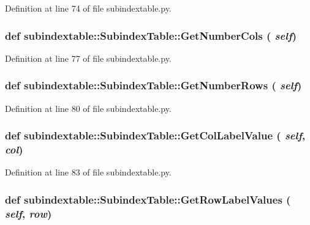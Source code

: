 Definition at line 74 of file subindextable.py.\hypertarget{classsubindextable_1_1SubindexTable_a227b7f00b023072f3b346466a266513}{
\subsubsection[GetNumberCols]{\setlength{\rightskip}{0pt plus 5cm}def subindextable::Subindex\-Table::Get\-Number\-Cols ( {\em self})}}
\label{classsubindextable_1_1SubindexTable_a227b7f00b023072f3b346466a266513}




Definition at line 77 of file subindextable.py.\hypertarget{classsubindextable_1_1SubindexTable_e4df8be09ce11ef31c05482c9e04b236}{
\subsubsection[GetNumberRows]{\setlength{\rightskip}{0pt plus 5cm}def subindextable::Subindex\-Table::Get\-Number\-Rows ( {\em self})}}
\label{classsubindextable_1_1SubindexTable_e4df8be09ce11ef31c05482c9e04b236}




Definition at line 80 of file subindextable.py.\hypertarget{classsubindextable_1_1SubindexTable_473cb5b7e6e7a31f8668256c1d42eb58}{
\subsubsection[GetColLabelValue]{\setlength{\rightskip}{0pt plus 5cm}def subindextable::Subindex\-Table::Get\-Col\-Label\-Value ( {\em self},  {\em col})}}
\label{classsubindextable_1_1SubindexTable_473cb5b7e6e7a31f8668256c1d42eb58}




Definition at line 83 of file subindextable.py.\hypertarget{classsubindextable_1_1SubindexTable_d37d12554092ade50c2ae8b5395b8bb9}{
\subsubsection[GetRowLabelValues]{\setlength{\rightskip}{0pt plus 5cm}def subindextable::Subindex\-Table::Get\-Row\-Label\-Values ( {\em self},  {\em row})}}
\label{classsubindextable_1_1SubindexTable_d37d12554092ade50c2ae8b5395b8bb9}




